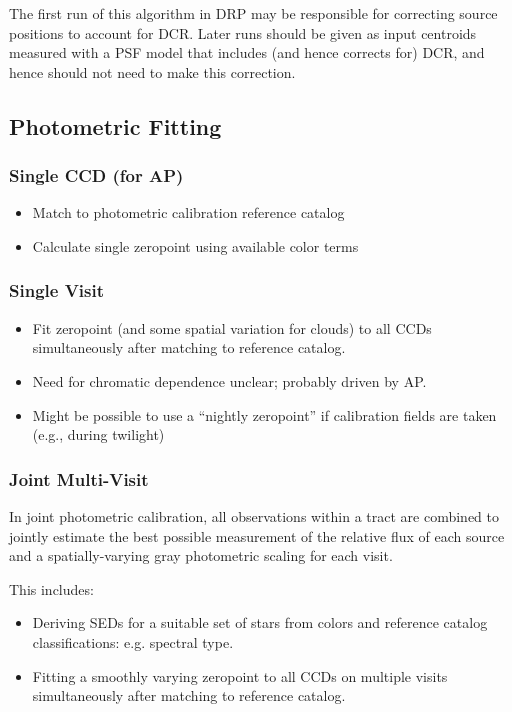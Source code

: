 The first run of this algorithm in DRP may be responsible for correcting source positions to account for DCR.  Later runs should be given as input centroids measured with a PSF model that includes (and hence corrects for) DCR, and hence should not need to make this correction.

\subsection{Photometric Fitting}
\label{sec:acPhotometricFitting}
\subsubsection{Single CCD (for AP)}
\label{sec:acSingleCCDPhotometricFit}
\begin{itemize}
\item Match to photometric calibration reference catalog
\item Calculate single zeropoint using available color terms
\end{itemize}
\subsubsection{Single Visit}
\label{sec:acSingleVisitPhotometricFit}
\begin{itemize}
\item Fit zeropoint (and some spatial variation for clouds) to all CCDs simultaneously after matching to reference catalog.
\item Need for chromatic dependence unclear; probably driven by AP.
\item Might be possible to use a ``nightly zeropoint'' if calibration fields are taken (e.g., during twilight)
\end{itemize}


\subsubsection{Joint Multi-Visit}
\label{sec:acJointPhotometricFit}

In joint photometric calibration, all observations within a tract are combined to jointly estimate the best possible measurement of the relative flux of each source and a spatially-varying gray photometric scaling for each visit.

This includes:
\begin{itemize}
\item Deriving SEDs for a suitable set of stars from colors and reference catalog classifications: e.g. spectral type.
\item Fitting a smoothly varying zeropoint to all CCDs on multiple visits simultaneously after matching to reference catalog.
\end{itemize}

